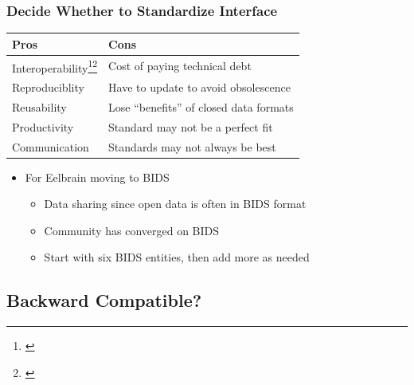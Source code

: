 \documentclass{beamer}
\begin{document}
\begin{frame}

\frametitle{Decide Whether to Standardize Interface}

\begin{table}[ht]
\centering
\begin{tabular}{p{} p{}}
\toprule
\textbf{Pros} & \textbf{Cons} \\
\midrule
Interoperability\footnote{\citet{BasuEtAl2019}}\footnote{\citet{DavidAndGreenstein1990}} %
 & Cost of paying technical debt \\ %
Reproduciblity\footnotemark[3] %
 & Have to update to avoid obsolescence \\ %
Reusability\footnotemark[3] %
 & Lose ``benefits'' of closed data formats \\ %
Productivity %
 & Standard may not be a perfect fit\\ %
Communication %
 & Standards may not always be best\\ %
\bottomrule
\end{tabular}
\end{table}

\begin{itemize}
\item For Eelbrain moving to BIDS
\begin{itemize}
\item Data sharing since open data is often in BIDS format
\item Community has converged on BIDS
\item Start with six BIDS entities, then add more as needed %
\end{itemize}
\end{itemize}
\end{frame}


\subsection[Backward?]{Backward Compatible?}
\end{document}
